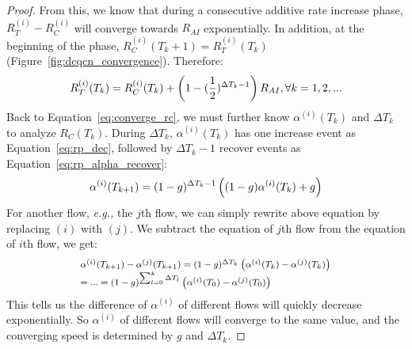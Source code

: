 \begin{proof}
From this, we know that during a consecutive additive rate increase phase, $R_T^{(i)} - R_C^{(i)}$
will converge towards $R_{AI}$ exponentially. In addition, at the beginning of the phase, 
$R_C^{(i)}({T_k} + 1) = R_T^{(i)}({T_k})$ (Figure~\ref{fig:dcqcn_convergence}). Therefore:
\begin{equation}
\small
R_T^{(i)}({T_k}) = R_C^{(i)}({T_k}) + \left( 1 - ({\frac{1}{2}})^{\Delta {T_k}-1}\right){R_{AI}},\forall k = 1,2,...
\label{eq:convergence_rt}
\end{equation}
Back to Equation~\ref{eq:converge_rc}, we must further know $\alpha ^{(i)}({T_k})$ and $\Delta T_k$ to 
analyze $R_C(T_k)$. During $\Delta T_k$, $\alpha ^{(i)}({T_k})$ has one increase event as Equation~\ref{eq:rp_dec},
followed by $\Delta T_k - 1$ recover events as Equation~\ref{eq:rp_alpha_recover}:
\begin{equation}
\small
{\alpha ^{(i)}}({T_{k + 1}}) = {(1 - g)^{\Delta {T_k} - 1}}\left( {(1 - g){\alpha ^{(i)}}({T_k}) + g} \right)
\label{eq:converge_alpha}
\end{equation}
For another flow, {\em e.g.,} the $j$th flow, we can simply rewrite above equation by replacing 
$(i)$ with $(j)$. We subtract the equation of $j$th flow from the equation of $i$th flow, we get:
\begin{equation}
\small
\begin{array}{l}
{\alpha ^{(i)}}({T_{k + 1}}) - {\alpha ^{(j)}}({T_{k + 1}}) = {(1 - g)^{\Delta {T_k}}}\left( {{\alpha ^{(i)}}({T_k}) - {\alpha ^{(j)}}({T_k})} \right)\\
 = ... = {(1 - g)^{\sum\nolimits_{l = 0}^k {\Delta {T_l}} }}\left( {{\alpha ^{(i)}}({T_0}) - {\alpha ^{(j)}}({T_0})} \right)
\end{array}
\label{eq:converge_alphaarray}
\end{equation}
This tells us the difference of $\alpha^{(i)}$ of different flows will quickly decrease exponentially. So $\alpha^{(i)}$
of different flows will converge to the same value, and the converging speed is determined by $g$ and
$\Delta T_k$. 


\end{proof}
